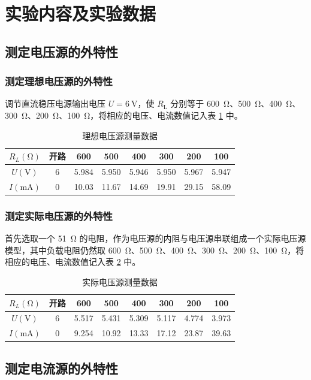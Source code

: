 \documentclass[a4paper,utf8]{article}
\begin{document}
\section{实验内容及实验数据}
\subsection{测定电压源的外特性}
\subsubsection{测定理想电压源的外特性}
调节直流稳压电源输出电压 $U=\SI{6}{\V}$，使 $R_\text{L}$ 分别等于 \SI{600}{\ohm}、\SI{500}{\ohm}、\SI{400}{\ohm}、\SI{300}{\ohm}、\SI{200}{\ohm}、\SI{100}{\ohm}，将相应的电压、电流数值记入表 \ref{tab:1} 中。
\begin{table}[!ht]
    \centering\begin{tabular}{c c c c c c c c}\toprule
        $R_L (\unit{\ohm})$ & 开路 & 600 & 500 & 400 & 300 & 200 & 100 \\ \midrule
        $U (\unit{\V})$ & 6 & 5.984 & 5.950 & 5.946 & 5.950 & 5.967 & 5.947 \\
        $I (\unit{\mA})$ & 0 & 10.03 & 11.67 & 14.69 & 19.91 & 29.15 & 58.09 \\ \bottomrule
    \end{tabular}\caption{理想电压源测量数据}\label{tab:1}
\end{table}
\subsubsection{测定实际电压源的外特性}
首先选取一个 \SI{51}{\ohm} 的电阻，作为电压源的内阻与电压源串联组成一个实际电压源模型，其中负载电阻仍然取 \SI{600}{\ohm}、\SI{500}{\ohm}、\SI{400}{\ohm}、\SI{300}{\ohm}、\SI{200}{\ohm}、\SI{100}{\ohm}，将相应的电压、电流数值记入表 \ref{tab:2} 中。
\begin{table}[!ht]
    \centering\begin{tabular}{c c c c c c c c}\toprule
        $R_L (\unit{\ohm})$ & 开路 & 600 & 500 & 400 & 300 & 200 & 100 \\ \midrule
        $U (\unit{\V})$ & 6 & 5.517 & 5.431 & 5.309 & 5.117 & 4.774 & 3.973 \\
        $I (\unit{\mA})$ & 0 & 9.254 & 10.92 & 13.33 & 17.12 & 23.87 & 39.63 \\ \bottomrule
    \end{tabular}\caption{实际电压源测量数据}\label{tab:2}
\end{table}
\subsection{测定电流源的外特性}
\end{document}
